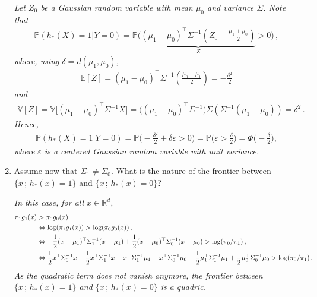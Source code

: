 \documentclass[a4paper,10pt,fleqn]{article}
\newcommand{\eqsp}{\,}
\newcommand{\rset}{\ensuremath{\mathbb{R}}}
\newcommand{\bP}{\mathbb{P}}
\newcommand{\1}{\ensuremath{\mathbbm{1}}}
\newcommand{\bE}{\mathbb{E}}
\begin{document}
\begin{enumerate}
\vspace{.2cm}

{\em
Let $Z_0$ be a Gaussian random variable with mean $\mu_0$ and variance $\Sigma$. Note that 
\begin{align*}
\bP (h_*(X) = 1 | Y = 0) = \bP \Big( \underbrace{(\mu_1 - \mu_0)^\top \Sigma^{-1} (Z_0 - \frac{\mu_1 + \mu_0}{2})}_{Z} > 0 \Big)\eqsp,
\end{align*}
where, using $\delta = d(\mu_{1},\mu_{0})$,   
\begin{align*}
\bE[Z] = (\mu_1 - \mu_0)^\top \Sigma^{-1} (\frac{\mu_0 - \mu_1 }{2})= - \frac{\delta^2}{2}
\end{align*}
and 
\begin{align*}
\mathbb{V}[Z] = \mathbb{V} \Big[ (\mu_1 - \mu_0)^\top \Sigma^{-1} X \Big] = \Big( (\mu_1 - \mu_0)^\top \Sigma^{-1}\Big) \Sigma \left( \Sigma^{-1} (\mu_1 - \mu_0)\right) = \delta^2\eqsp.
\end{align*}
Hence,
\begin{align*}
\bP (h_*(X) = 1 | Y = 0) = \bP \Big( - \frac{\delta^2}{2} + \delta \varepsilon >0 \Big)= \bP\Big(\varepsilon > \frac{\delta}{2}\Big) = \Phi \Big(-\frac{\delta}{2}\Big),
\end{align*}
where $\varepsilon$ is a centered Gaussian random variable with unit variance.
}
\item Assume now that $\Sigma_{1}\neq \Sigma_{0}$. What is the nature of the frontier between $\{x\eqsp;\eqsp h_{*}(x)=1\}$ and $\{x\eqsp;\eqsp h_{*}(x)=0\}$?

\vspace{.2cm}

{\em
In this case, for all $x\in\rset^d$, 
\begin{align*}
 \pi_1 g_1(x) &> \pi_0 g_0(x) \\
&\Leftrightarrow  \log(\pi_1 g_1(x)) > \log(\pi_0 g_0(x))\eqsp,\\
&\Leftrightarrow  -{1\over 2}(x-\mu_1)^\top\Sigma_1^{-1}(x-\mu_1) + {1\over 2}(x-\mu_0)^\top\Sigma_0^{-1}(x-\mu_0) > \log(\pi_0/ \pi_1)\eqsp,\\
&\Leftrightarrow	\frac{1}{2}x^\top\Sigma_0^{-1}x  -\frac{1}{2}x^\top\Sigma_1^{-1}x +	 x^\top\Sigma_1^{-1}\mu_1 - x^\top\Sigma_0^{-1}\mu_0 - \frac{1}{2} \mu_1^\top\Sigma^{-1}_1\mu_1 + \frac{1}{2} \mu_0^\top\Sigma^{-1}_0\mu_0  > \log(\pi_0/ \pi_1)\eqsp.
\end{align*}
As the quadratic term does not vanish anymore, the frontier between $\{x\eqsp;\eqsp h_{*}(x)=1\}$ and $\{x\eqsp;\eqsp h_{*}(x)=0\}$ is a quadric.
}
\end{enumerate}
\end{document}
